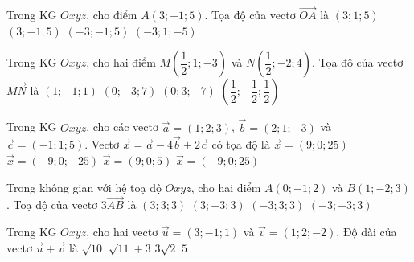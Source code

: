 \begin{ex}%
Trong KG $Oxyz$, cho điểm $A(3;-1;5)$. Tọa độ của vectơ $\overrightarrow{OA}$ là
\choice
{$(3;1;5)$}
{\True $(3;-1;5)$}
{$(-3;-1;5)$}
{$(-3;1;-5)$}
\end{ex}


\begin{ex}%
Trong KG $Oxyz$, cho hai điểm $M\left(\dfrac{1}{2};1;-3\right)$ và $N\left(\dfrac{1}{2};-2;4\right)$. Tọa độ của vectơ $\overrightarrow{MN}$ là
\choice
{$(1;-1;1)$}
{\True $(0;-3;7)$}
{$(0;3;-7)$}
{$\left(\dfrac{1}{2};-\dfrac{1}{2};\dfrac{1}{2} \right)$}
\end{ex}


\begin{ex}%
Trong KG $Oxyz$, cho các vectơ $\overrightarrow{a}=(1;2;3)$, $\overrightarrow{b}=(2;1;-3)$ và $\overrightarrow{c}=(-1;1;5)$. Vectơ $\overrightarrow{x}=\overrightarrow{a}-4\overrightarrow{b}+2\overrightarrow{c}$ có tọa độ là
\choice
{$\overrightarrow{x}=(9;0;25)$}
{$\overrightarrow{x}=(-9;0;-25)$}
{$\overrightarrow{x}=(9;0;5)$}
{\True $\overrightarrow{x}=(-9;0;25)$}
\end{ex}


\begin{ex}%
Trong không gian với hệ toạ độ $Oxyz$, cho hai điểm $A(0;-1;2)$ và $B(1;-2;3)$. Toạ độ của vectơ $3\overrightarrow{AB}$ là
\choice
{$(3;3;3)$}
{\True $(3;-3;3)$}
{$(-3;3;3)$}
{$(-3;-3;3)$}
\end{ex}


\begin{ex}%
Trong KG $Oxyz$, cho hai vectơ $\overrightarrow{u}=(3;-1;1)$ và $\overrightarrow{v}=(1;2;-2)$. Độ dài của vectơ $\overrightarrow{u}+\overrightarrow{v}$ là
\choice
{$\sqrt{10}$}
{$\sqrt{11}+3$}
{\True $3\sqrt{2}$}
{$5$}
\end{ex}


